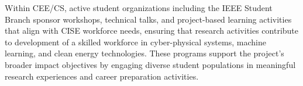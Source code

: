 \documentclass[12pt]{article}
\begin{document}
Within CEE/CS, active student organizations including the IEEE Student Branch sponsor workshops, technical talks, and project-based learning activities that align with CISE workforce needs, ensuring that research activities contribute to development of a skilled workforce in cyber-physical systems, machine learning, and clean energy technologies. These programs support the project's broader impact objectives by engaging diverse student populations in meaningful research experiences and career preparation activities.
\end{document}
